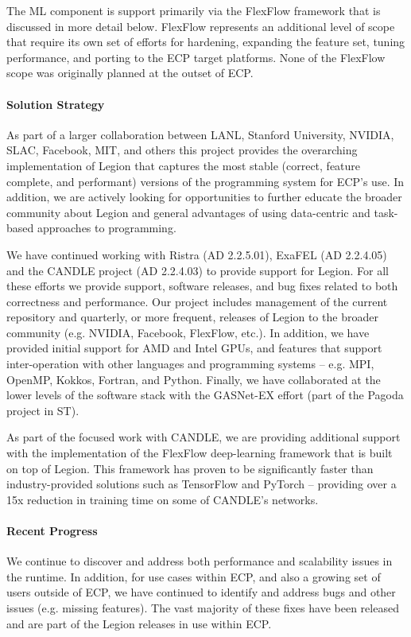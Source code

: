 The ML component is support primarily via the FlexFlow framework that
is discussed in more detail below. FlexFlow represents an additional
level of scope that require its own set of efforts for hardening,
expanding the feature set, tuning performance, and porting to the ECP
target platforms.  None of the FlexFlow scope was originally planned at the
outset of ECP. 

\paragraph{Solution Strategy}
As part of a larger collaboration between LANL, Stanford University,
NVIDIA, SLAC, Facebook, MIT, and others this project provides the
overarching implementation of Legion that captures the most stable
(correct, feature complete, and performant) versions of the programming
system for ECP's use.  In addition, we are actively looking for
opportunities to further educate the broader community about Legion 
and general advantages of using data-centric and task-based approaches
to programming.

We have continued working with Ristra (AD 2.2.5.01), ExaFEL (AD
2.2.4.05) and the CANDLE project (AD 2.2.4.03) to provide support for
Legion.  For all these efforts we provide support, software releases,
and bug fixes related to both correctness and performance. Our project
includes management of the current repository and quarterly, or more
frequent, releases of Legion to the broader community (e.g. NVIDIA,
Facebook, FlexFlow, etc.).  In addition, we have provided initial
support for AMD and Intel GPUs, and features that support
inter-operation with other languages and programming systems --
e.g. MPI, OpenMP, Kokkos, Fortran, and Python. Finally, we have collaborated
at the lower levels of the software stack with the GASNet-EX effort (part
of the Pagoda project in ST).

As part of the focused work with CANDLE, we are providing additional
support with the implementation of the FlexFlow deep-learning
framework that is built on top of Legion.  This framework has proven to
be significantly faster than industry-provided solutions such as TensorFlow
and PyTorch -- providing over a 15x reduction in training time on some of
CANDLE's networks. 

\paragraph{Recent Progress}

We continue to discover and address both performance and scalability
issues in the runtime.  In addition, for use cases within ECP, and
also a growing set of users outside of ECP, we have continued to
identify and address bugs and other issues (e.g. missing features).
The vast majority of these fixes have been released and are part of
the Legion releases in use within ECP.

